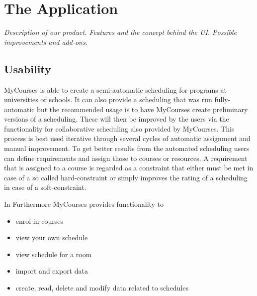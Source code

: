 

\section{The Application}

\emph{Description of our product. Features and the concept behind the UI. Possible improvements and add-ons.}

\subsection{Usability}

MyCourses is able to create a semi-automatic scheduling for programs at universities or schools. It can also provide a scheduling that was run fully-automatic but the recommended usage is to have MyCourses create preliminary versions of a scheduling. These will then be improved by the users via the functionality for collaborative scheduling also provided by MyCourses. This process is best used iterative through several cycles of automatic assignment and manual improvement. To get better results from the automated scheduling users can define requirements and assign those to courses or resources. A requirement that is assigned to a course is regarded as a constraint that either must be met in case of a so called hard-constraint or simply improves the rating of a scheduling in case of a soft-constraint.

In Furthermore MyCourses provides functionality to

\begin{itemize}
\item enrol in courses

\item view your own schedule

\item view schedule for a room

\item import and export data

\item create, read, delete and modify data related to schedules
\end{itemize}
